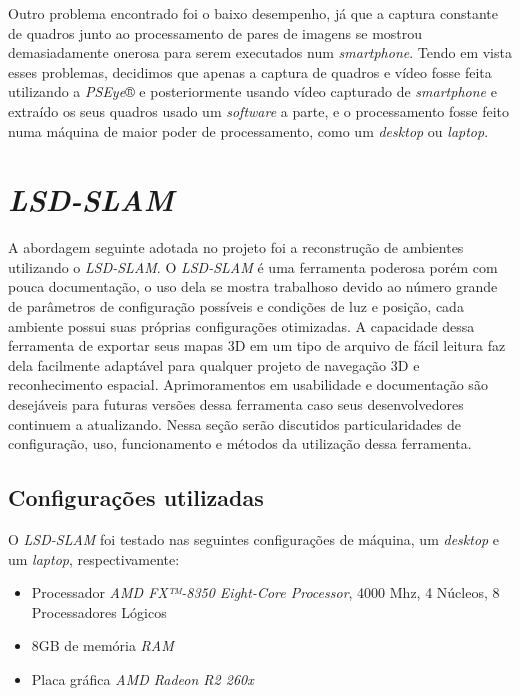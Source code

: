 Outro problema encontrado foi o baixo desempenho, já que a captura constante de quadros junto ao processamento de pares de imagens se mostrou demasiadamente onerosa para serem executados num \textit{smartphone}. Tendo em vista esses problemas, decidimos que apenas a captura de quadros e vídeo fosse feita utilizando a \textit{PSEye}® e posteriormente usando vídeo capturado de \textit{smartphone} e extraído os seus quadros usado um \textit{software} a parte, e o processamento fosse feito numa máquina de maior poder de processamento, como um \textit{desktop} ou \textit{laptop}.

\section{\textit{LSD-SLAM}}

A abordagem seguinte adotada no projeto foi a reconstrução de ambientes utilizando o \textit{LSD-SLAM}. O \textit{LSD-SLAM} é uma ferramenta poderosa porém com pouca documentação, o uso dela se mostra trabalhoso devido ao número grande de parâmetros de configuração possíveis e condições de luz e posição, cada ambiente possui suas próprias configurações otimizadas. A capacidade dessa ferramenta de exportar seus mapas 3D em um tipo de arquivo de fácil leitura faz dela facilmente adaptável para qualquer projeto de navegação 3D e reconhecimento espacial. Aprimoramentos em usabilidade e documentação são desejáveis para futuras versões dessa ferramenta caso seus desenvolvedores continuem a atualizando. Nessa seção serão discutidos particularidades de configuração, uso, funcionamento e métodos da utilização dessa ferramenta.

\subsection{Configurações utilizadas}

O \textit{LSD-SLAM} foi testado nas seguintes configurações de máquina, um \textit{desktop} e um \textit{laptop}, respectivamente:

\begin{itemize}
	\item{Processador	\textit{AMD FX™-8350 Eight-Core Processor}, 4000 Mhz, 4 Núcleos, 8 Processadores Lógicos}
	\item{8GB de memória \textit{RAM}}
	\item{Placa gráfica \textit{AMD Radeon R2 260x}}
\end{itemize}

